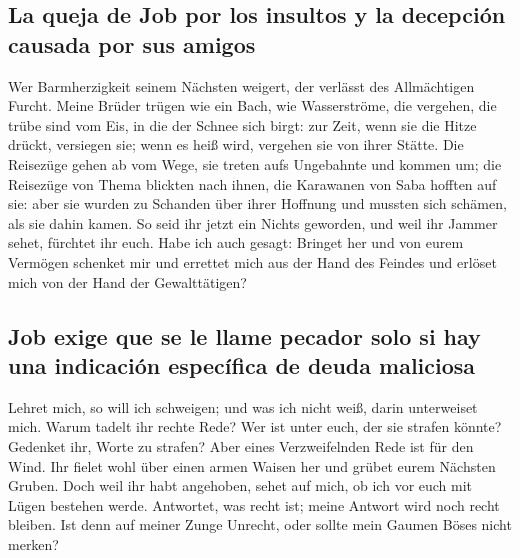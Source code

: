 \hypertarget{la-queja-de-job-por-los-insultos-y-la-decepciuxf3n-causada-por-sus-amigos}{%
\subsection{La queja de Job por los insultos y la decepción causada por
sus
amigos}\label{la-queja-de-job-por-los-insultos-y-la-decepciuxf3n-causada-por-sus-amigos}}

 Wer Barmherzigkeit seinem Nächsten weigert, der verlässt
des Allmächtigen Furcht.  Meine Brüder trügen wie ein
Bach, wie Wasserströme, die vergehen,  die trübe sind vom
Eis, in die der Schnee sich birgt:  zur Zeit, wenn sie
die Hitze drückt, versiegen sie; wenn es heiß wird, vergehen sie von
ihrer Stätte.  Die Reisezüge gehen ab vom Wege, sie
treten aufs Ungebahnte und kommen um;  die Reisezüge von
Thema blickten nach ihnen, die Karawanen von Saba hofften auf sie:
 aber sie wurden zu Schanden über ihrer Hoffnung und
mussten sich schämen, als sie dahin kamen.  So seid ihr
jetzt ein Nichts geworden, und weil ihr Jammer sehet, fürchtet ihr euch.
 Habe ich auch gesagt: Bringet her und von eurem Vermögen
schenket mir  und errettet mich aus der Hand des Feindes
und erlöset mich von der Hand der Gewalttätigen?

\hypertarget{job-exige-que-se-le-llame-pecador-solo-si-hay-una-indicaciuxf3n-especuxedfica-de-deuda-maliciosa}{%
\subsection{Job exige que se le llame pecador solo si hay una indicación
específica de deuda
maliciosa}\label{job-exige-que-se-le-llame-pecador-solo-si-hay-una-indicaciuxf3n-especuxedfica-de-deuda-maliciosa}}

 Lehret mich, so will ich schweigen; und was ich nicht
weiß, darin unterweiset mich.  Warum tadelt ihr rechte
Rede? Wer ist unter euch, der sie strafen könnte? 
Gedenket ihr, Worte zu strafen? Aber eines Verzweifelnden Rede ist für
den Wind.  Ihr fielet wohl über einen armen Waisen her
und grübet eurem Nächsten Gruben.  Doch weil ihr habt
angehoben, sehet auf mich, ob ich vor euch mit Lügen bestehen werde.
 Antwortet, was recht ist; meine Antwort wird noch recht
bleiben.  Ist denn auf meiner Zunge Unrecht, oder sollte
mein Gaumen Böses nicht merken?

